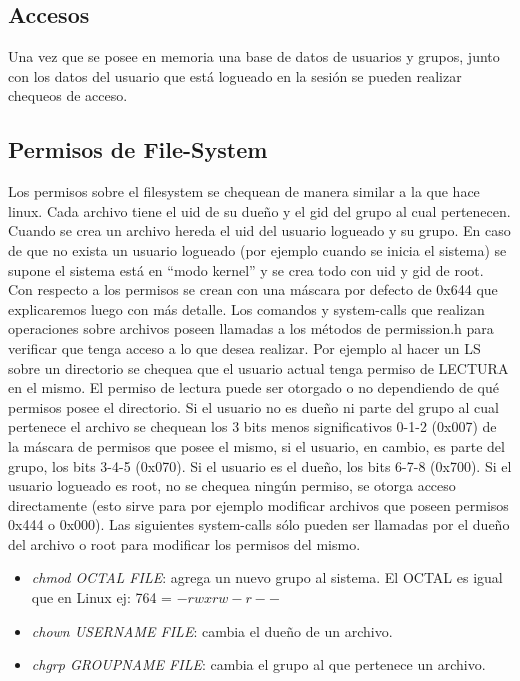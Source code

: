 \documentclass[english]{article}
\begin{document}
 
\subsection{Accesos}
Una vez que se posee en memoria una base de datos de usuarios y grupos, junto con los datos del usuario que está logueado en la sesión se pueden realizar chequeos de acceso.

\subsection {Permisos de File-System}
Los permisos sobre el filesystem se chequean de manera similar a la que hace linux. Cada archivo tiene el uid de su dueño y el gid del grupo al cual pertenecen.
Cuando se crea un archivo hereda el uid del usuario logueado y su grupo. En caso de que no exista un usuario logueado (por ejemplo cuando se inicia el sistema) se supone el sistema está en “modo kernel” y se crea todo con uid y gid de root. Con respecto a los permisos se crean con una máscara por defecto de 0x644 que explicaremos luego con más detalle.
Los comandos y system-calls que realizan operaciones sobre archivos poseen llamadas a los métodos de permission.h para verificar que tenga acceso a lo que desea realizar. Por ejemplo al hacer un LS sobre un directorio se chequea que el usuario actual tenga permiso de LECTURA en el mismo. El permiso de lectura puede ser otorgado o no dependiendo de qué permisos posee el directorio.
Si el usuario no es dueño ni parte del grupo al cual pertenece el archivo se chequean los 3 bits menos significativos 0-1-2 (0x007) de la máscara de permisos que posee el mismo, si el usuario, en cambio, es parte del grupo, los bits 3-4-5 (0x070). Si el usuario es el dueño, los bits 6-7-8 (0x700).
Si el usuario logueado es root, no se chequea ningún permiso, se otorga acceso directamente (esto sirve para por ejemplo modificar archivos que poseen permisos 0x444 o 0x000).
Las siguientes system-calls sólo pueden ser llamadas por el dueño del archivo o root para modificar los permisos del mismo.
\begin{itemize}
\item \emph{chmod OCTAL FILE}: agrega un nuevo grupo al sistema.
\subitem El OCTAL es igual que en Linux ej: 764 = $-rwxrw-r--$
\item \emph{chown USERNAME FILE}: cambia el dueño de un archivo.
\item \emph{chgrp GROUPNAME FILE}: cambia el grupo al que pertenece un archivo.
\end{itemize}
 
\end{document}
